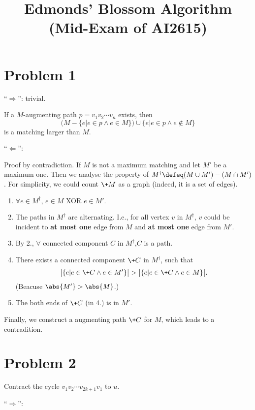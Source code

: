 \documentclass{article}
\begin{document}
\title{\vspace{-0.7em}Edmonds’ Blossom Algorithm (Mid-Exam of AI2615)}
\maketitle

\section*{Problem 1}
``$\Longrightarrow$'': trivial.

\vspace{0.5em}
If a $M$-augmenting path $p=v_1v_2\cdots v_n$ exists, then 
\[
	\big(M-\{e|e\in p\land e\in M\}\big)
	\cup
	\{e|e\in p\land e\notin M\}
\]
is a matching larger than $M$.

\vspace{1em}
``$\Longleftarrow$'':

\vspace{0.5em}
Proof by contradiction. If $M$ is not a maximum matching and let $M'$ be a maximum one.
Then we analyse the property of $M^\dagger\defeq(M\cup M')-(M\cap M')$. For simplicity, we could count $\+M$ as a graph (indeed, it is a set of edges).
\begin{enumerate}
	\item 
		$\forall e\in M^\dagger$, $e\in M$ XOR $e\in M'$.
	\item 
		The paths in $M^\dagger$ are alternating. I.e., for all vertex $v$ in $M^\dagger$, $v$ could be incident to \textbf{at most one} edge from $M$ and \textbf{at most one} edge from $M'$. 
	\item
		By 2., $\forall$ connected component $C$ in $M^\dagger$,$C$ is a path.
	\item
		There exists a connected component $\+C$ in $M^\dagger$, such that 
		\[
			\big|\{e|e\in \+C\land e\in M'\}\big|
			>
			\big|\{e|e\in \+C\land e\in M\}\big|
		.\]
		(Beacuse $\abs{M'}>\abs{M}$.)
	\item
		The both ends of $\+C$ (in 4.) is in $M'$.
\end{enumerate}
Finally, we construct a augmenting path $\+C$ for $M$, which leads to a contradition.

\section*{Problem 2}
Contract the cycle $v_1v_2\cdots v_{2k+1}v_1$ to $u$.

\vspace{0.5em}
``$\Longrightarrow$'':
\end{document}
